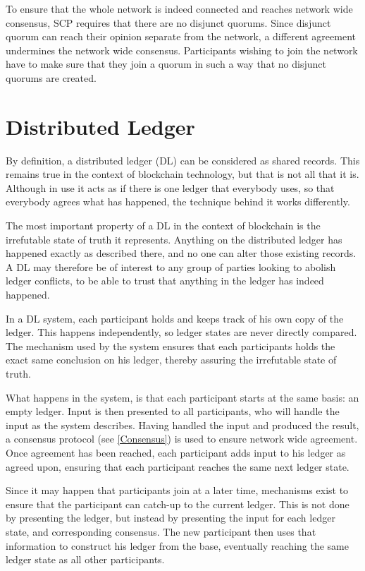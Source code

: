 To ensure that the whole network is indeed connected and reaches network wide consensus, SCP requires that there are no disjunct quorums. Since disjunct quorum can reach their opinion separate from the network, a different agreement undermines the network wide consensus. Participants wishing to join the network have to make sure that they join a quorum in such a way that no disjunct quorums are created.

\section{Distributed Ledger} \label{DL}
By definition, a distributed ledger \cite{DL} (DL) can be considered as shared records. This remains true in the context of blockchain technology, but that is not all that it is. Although in use it acts as if there is one ledger that everybody uses, so that everybody agrees what has happened, the technique behind it works differently.

The most important property of a DL in the context of blockchain is the irrefutable state of truth it represents. Anything on the distributed ledger has happened exactly as described there, and no one can alter those existing records. A DL may therefore be of interest to any group of parties looking to abolish ledger conflicts, to be able to trust that anything in the ledger has indeed happened.

In a DL system, each participant holds and keeps track of his own copy of the ledger. This happens independently, so ledger states are never directly compared. The mechanism used by the system ensures that each participants holds the exact same conclusion on his ledger, thereby assuring the irrefutable state of truth.

What happens in the system, is that each participant starts at the same basis: an empty ledger. Input is then presented to all participants, who will handle the input as the system describes. Having handled the input and produced the result, a consensus protocol (see \ref{Consensus}) is used to ensure network wide agreement. Once agreement has been reached, each participant adds input to his ledger as agreed upon, ensuring that each participant reaches the same next ledger state.

Since it may happen that participants join at a later time, mechanisms exist to ensure that the participant can catch-up to the current ledger. This is not done by presenting the ledger, but instead by presenting the input for each ledger state, and corresponding consensus. The new participant then uses that information to construct his ledger from the base, eventually reaching the same ledger state as all other participants.

